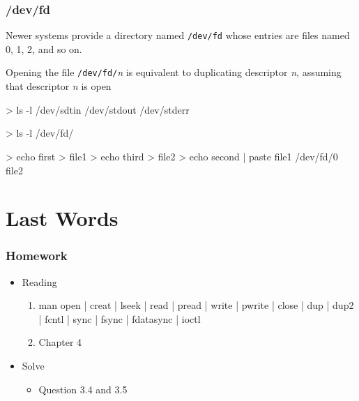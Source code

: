 \documentclass[newPxFont,sthlmFooter,nooffset]{beamer}
\begin{document}
\begin{frame}[containsverbatim,t]
  \frametitle{/dev/fd}
Newer systems provide a directory named \texttt{/dev/fd} whose entries are files named 0, 1, 2, and so on.

Opening the file \texttt{/dev/fd/}\textit{n} is equivalent to duplicating descriptor \textit{n}, assuming that descriptor \textit{n} is open
\bigskip

\begin{codedef}
> ls -l /dev/sdtin /dev/stdout /dev/stderr

> ls -l /dev/fd/

> echo first > file1
> echo third > file2
> echo second | paste file1 /dev/fd/0 file2
\end{codedef}

\end{frame}


\section{Last Words}
\begin{frame}[containsverbatim,t]
  \frametitle{Homework}
  \begin{itemize}
  \item Reading
    \begin{enumerate}[ ]
    \item
      \begin{sthlmLatex}
man { open | creat | lseek | read | pread | write | pwrite | close | dup | dup2 | fcntl | sync | fsync | fdatasync | ioctl }
      \end{sthlmLatex}

    \item Chapter 4
    \end{enumerate}
  \item Solve
    \begin{itemize}
    \item Question 3.4 and 3.5
    \end{itemize}
  \end{itemize}
\end{frame}
\end{document}
